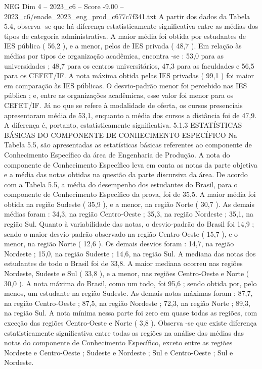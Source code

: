 \begin{textsample}{NEG Dim 4 – 2023\_c6 – Score -9.00 – 2023\_c6/enade\_2023\_eng\_prod\_c677c7f341.txt}
A partir dos dados da Tabela 5.4, observa -se que há diferença estatisticamente significativa entre as médias dos tipos de categoria administrativa.
A maior média foi obtida por estudantes de IES pública ( 56,2 ), e a menor, pelos de IES privada ( 48,7 ).
Em relação às médias por tipos de organização acadêmica, encontra -se : 53,0 para as universidades ; 48,7 para os centros universitários, 47,3 para as faculdades e 56,5 para os CEFET/IF.
A nota máxima obtida pelas IES privadas ( 99,1 ) foi maior em comparação às IES públicas.
O desvio-padrão menor foi percebido nas IES pública ; e, entre as organizações acadêmicas, esse valor foi menor para os CEFET/IF.
Já no que se refere à modalidade de oferta, os cursos presenciais apresentaram média de 53,1, enquanto a média dos cursos a distância foi de 47,9.
A diferença é, portanto, estatisticamente significativa. 5.1.3 ESTATÍSTICAS BÁSICAS DO COMPONENTE DE CONHECIMENTO ESPECÍFICO Na Tabela 5.5, são apresentadas as estatísticas básicas referentes ao componente de Conhecimento Específico da área de Engenharia de Produção.
A nota do componente de Conhecimento Específico leva em conta as notas da parte objetiva e a média das notas obtidas na questão da parte discursiva da área.
De acordo com a Tabela 5.5, a média do desempenho dos estudantes do Brasil, para o componente de Conhecimento Específico da prova, foi de 35,5.
A maior média foi obtida na região Sudeste ( 35,9 ), e a menor, na região Norte ( 30,7 ).
As demais médias foram : 34,3, na região Centro-Oeste ; 35,3, na região Nordeste ; 35,1, na região Sul.
Quanto à variabilidade das notas, o desvio-padrão do Brasil foi 14,9 ; sendo o maior desvio-padrão observado na região Centro-Oeste ( 15,7 ), e o menor, na região Norte ( 12,6 ).
Os demais desvios foram : 14,7, na região Nordeste ; 15,0, na região Sudeste ; 14,6, na região Sul.
A mediana das notas dos estudantes de todo o Brasil foi de 33,8.
A maior mediana ocorreu nas regiões Nordeste, Sudeste e Sul ( 33,8 ), e a menor, nas regiões Centro-Oeste e Norte ( 30,0 ).
A nota máxima do Brasil, como um todo, foi 95,6 ; sendo obtida por, pelo menos, um estudante na região Sudeste.
As demais notas máximas foram : 87,7, na região Centro-Oeste ; 87,5, na região Nordeste ; 72,3, na região Norte ; 89,3, na região Sul.
A nota mínima nessa parte foi zero em quase todas as regiões, com exceção das regiões Centro-Oeste e Norte ( 3,8 ).
Observa -se que existe diferença estatisticamente significativa entre todas as regiões na análise das médias das notas do componente de Conhecimento Específico, exceto entre as regiões Nordeste e Centro-Oeste ; Sudeste e Nordeste ; Sul e Centro-Oeste ; Sul e Nordeste.

\end{textsample}
